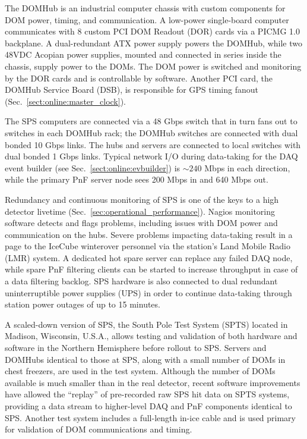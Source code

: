 The DOMHub is an industrial computer chassis with custom components for DOM
power, timing, and communication.  A low-power single-board computer
communicates with 8 custom PCI DOM Readout (DOR) cards via a PICMG 1.0
backplane.  A dual-redundant ATX power supply powers the DOMHub, while two
48VDC Acopian power supplies, mounted and connected in series inside the
chassis, supply power to the DOMs.  The DOM power is switched and
monitoring by the DOR cards and is controllable by software.  Another PCI
card, the DOMHub Service Board (DSB), is responsible for GPS timing fanout
(Sec.~\ref{sect:online:master_clock}).

The SPS computers are connected via a 48 Gbps switch that in turn fans out
to switches in each DOMHub rack; the DOMHub switches are connected with
dual bonded 10 Gbps links.  The hubs and servers are connected to local
switches with dual bonded 1 Gbps links.  Typical network I/O during
data-taking for the DAQ event builder (see
Sec.~\ref{sect:online:evbuilder}) is $\sim240$ Mbps in each direction, while
the primary PnF server node sees 200 Mbps in and 640 Mbps out.

Redundancy and continuous monitoring of SPS is one of the keys to a high
detector livetime (Sec.~\ref{sec:operational_performance}).  Nagios
monitoring software detects and flags problems, 
including issues with DOM power and communication on the hubs.  Severe
problems impacting data-taking result in a page to the IceCube winterover 
personnel via the station's Land Mobile Radio (LMR) system.  A dedicated
hot spare server can replace any failed DAQ node, while spare PnF filtering
clients can be started to increase throughput in case of a data filtering
backlog.  SPS hardware is also connected to dual redundant uninterruptible
power supplies (UPS) in order to continue data-taking through station power
outages of up to 15 minutes.

A scaled-down version of SPS, the South Pole Test System (SPTS) located in
Madison, Wisconsin, U.S.A., allows testing and validation of both hardware
and software in the Northern Hemisphere before rollout to SPS.  Servers and DOMHubs
identical to those at SPS, along with a small number of DOMs in chest
freezers, are used in the test system.  Although the number of DOMs
available is much smaller than in the real detector, recent software
improvements have allowed the ``replay'' of pre-recorded raw SPS hit data
on SPTS systems, providing a data stream to higher-level DAQ and PnF
components identical to SPS.  Another test system includes a full-length
in-ice cable and is used primary for validation of DOM communications and
timing.

